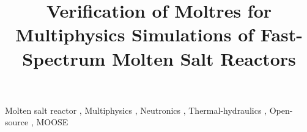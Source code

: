 \documentclass[review]{elsarticle}
\begin{document}
\begin{frontmatter}
\title{Verification of Moltres for Multiphysics Simulations of Fast-Spectrum
Molten Salt Reactors}






\begin{keyword}
Molten salt reactor \sep
Multiphysics \sep
Neutronics \sep
Thermal-hydraulics \sep
Open-source \sep
MOOSE
\end{keyword}


\end{frontmatter}
\glsresetall











\pagebreak

\end{document}
